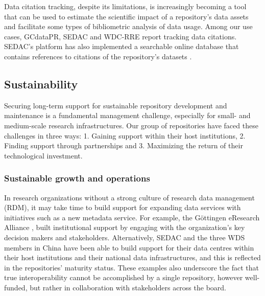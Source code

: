 \documentclass{interact}
\begin{document}
Data citation tracking, despite its limitations, is increasingly becoming a tool that can be used to estimate the scientific impact of a repository's data assets and facilitate some types of bibliometric analysis of data usage. Among our use cases, GCdataPR, SEDAC and WDC-RRE report tracking data citations. SEDAC’s platform has also implemented a searchable online database that contains references to citations of the repository’s datasets \parencite{sedac_citations_nodate}. 

\subsection{Sustainability}
Securing long-term support for sustainable repository development and maintenance is a fundamental management challenge, especially for small- and medium-scale research infrastructures. Our group of repositories have faced these challenges in three ways: 1. Gaining support within their host institutions, 2. Finding support through partnerships and 3. Maximizing the return of their technological investment. 

\subsubsection{Sustainable growth and operations}

In research organizations without a strong culture of research data management (RDM), it may take time to build support for expanding data services with initiatives such as a new metadata service. For example, the Göttingen eResearch Alliance \parencite{dierkes_gottingen_2016}, built institutional support by engaging with the organization's key decision makers and stakeholders. Alternatively, SEDAC and the three WDS members in China have been able to build support for their data centres within their host institutions and their national data infrastructures, and this is reflected in the repositories’ maturity status. These examples also underscore the fact that true interoperability cannot be accomplished by a single repository, however well-funded, but rather in collaboration with stakeholders across the board.
\end{document}
